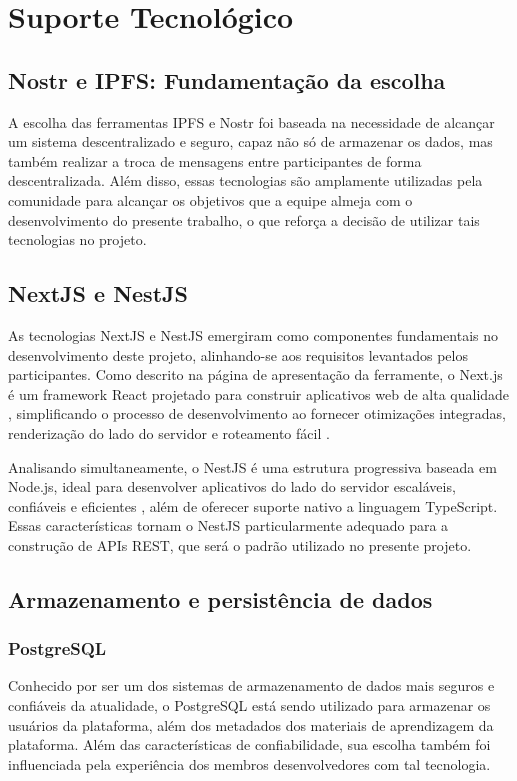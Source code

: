\chapter[Elementos do Texto]{Suporte Tecnológico}

\section{Nostr e IPFS: Fundamentação da escolha}
A escolha das ferramentas IPFS e Nostr foi baseada na necessidade de alcançar um sistema descentralizado e seguro, capaz não só de armazenar os dados, mas também realizar a troca de mensagens entre participantes de forma descentralizada. Além disso, essas tecnologias são amplamente utilizadas pela comunidade para alcançar os objetivos que a equipe almeja com o desenvolvimento do presente trabalho, o que reforça a decisão de utilizar tais tecnologias no projeto.

\section{NextJS e NestJS}
As tecnologias NextJS e NestJS emergiram como componentes fundamentais no desenvolvimento deste projeto, alinhando-se aos requisitos levantados pelos participantes. Como descrito na página de apresentação da ferramente, o Next.js é um framework React projetado para construir aplicativos web de alta qualidade , simplificando o processo de desenvolvimento ao fornecer otimizações integradas, renderização do lado do servidor e roteamento fácil \cite{nextjs2025}. 

Analisando simultaneamente, o NestJS é uma estrutura progressiva baseada em Node.js, ideal para desenvolver aplicativos do lado do servidor escaláveis, confiáveis e eficientes \cite{nestjs2025}, além de oferecer suporte nativo a linguagem TypeScript. Essas características tornam o NestJS particularmente adequado para a construção de APIs REST, que será o padrão utilizado no presente projeto.

\section{Armazenamento e persistência de dados}

\subsection{PostgreSQL}
Conhecido por ser um dos sistemas de armazenamento de dados mais seguros e confiáveis da atualidade, o PostgreSQL está sendo utilizado para armazenar os usuários da plataforma, além dos metadados dos materiais de aprendizagem da plataforma. Além das características de confiabilidade, sua escolha também foi influenciada pela experiência dos membros desenvolvedores com tal tecnologia.

